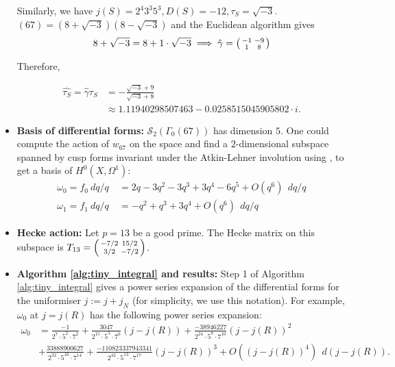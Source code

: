 \begin{itemize}
Similarly, we have $j(S) = 2^4 3^3 5^3, D(S) = -12, \tau_S = \sqrt{-3}$. $(67) =
(8+\sqrt{-3})(8-\sqrt{-3})$ and the Euclidean algorithm gives
\[
  8 + \sqrt{-3} = 8 + 1\cdot\sqrt{-3} \implies \hat{\gamma} = \begin{psmallmatrix}
    -1       & -9 \\
    1       & 8
\end{psmallmatrix}
\]

Therefore,

\begin{align*}
\hat{\tau_S} = \hat{\gamma}\tau_S &=  -\frac{\sqrt{-3} + 9}{\sqrt{-3} + 8} \\ &\approx 1.11940298507463 - 0.0258515045905802\cdot i.
\end{align*}


\item \textbf{Basis of differential forms:} $\mathcal{S}_2(\Gamma_0(67))$ has dimension $5$. One could compute the action of $w_{67}$ on the space and find a $2$-dimensional subspace spanned by cusp forms invariant under the Atkin-Lehner involution using \SageMath, to get a basis of $H^0(X,\Omega^1)$: \begin{align*} \omega_0 = f_0 \  dq/q \  &= 2q -3q^2 - 3q^3 + 3q^4 - 6q^5 + O(q^6) \ \ dq/q\\ \omega_1 = f_1 \  dq/q \ &= -q^2 + q^3 + 3q^4 + O(q^6) \ \ dq/q
\end{align*}


\item \textbf{Hecke action:} Let $p=13$ be a good prime. The Hecke matrix on this subspace is $T_{13}= \begin{psmallmatrix}
    -7/2 & 15/2 \\ 3/2 & -7/2
\end{psmallmatrix}$. 

\item \textbf{Algorithm \ref{alg:tiny_integral} and results:} Step 1 of Algorithm \ref{alg:tiny_integral} gives a power series expansion of the differential forms for the uniformiser $j := j + j_N$ (for simplicity, we use this notation). For example, $\omega_0$ at $j=j(R)$ has the following power series expansion:\begin{align*}
    \omega_0 &= \frac{-1}{2^7 \cdot 5^2 \cdot 7^2
} +  \frac{3047}{2^{15} \cdot 5^5 \cdot 7^6
}(j-j(R)) +  \frac{-38946227}{2^{24} \cdot 5^8 \cdot 7^{10}
}(j-j(R))^2 \\ &+ \frac{33888900627}{2^{32} \cdot 5^{10} \cdot 7^{14}
} + \frac{-110823337943341}{2^{42} \cdot 5^{13} \cdot 7^{17}
}(j-j(R))^3 + O((j-j(R))^4) \ \ d(j-j(R)).
\end{align*}


\end{itemize}
